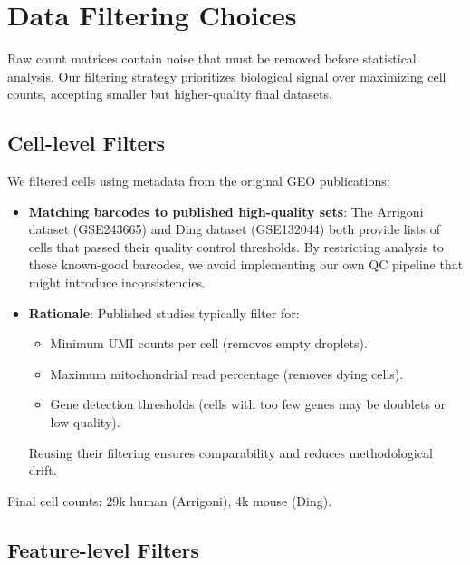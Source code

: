 \section{Data Filtering Choices}

Raw count matrices contain noise that must be removed before statistical analysis. Our filtering strategy prioritizes biological signal over maximizing cell counts, accepting smaller but higher-quality final datasets.

\subsection*{Cell-level Filters}

We filtered cells using metadata from the original GEO publications:

\begin{itemize}
    \item \textbf{Matching barcodes to published high-quality sets}: The Arrigoni dataset (GSE243665) and Ding dataset (GSE132044\cite{ding2020systematic}) both provide lists of cells that passed their quality control thresholds. By restricting analysis to these known-good barcodes, we avoid implementing our own QC pipeline that might introduce inconsistencies.
    \item \textbf{Rationale}: Published studies typically filter for:
    \begin{itemize}
        \item Minimum UMI counts per cell (removes empty droplets).
        \item Maximum mitochondrial read percentage (removes dying cells).
        \item Gene detection thresholds (cells with too few genes may be doublets or low quality).
    \end{itemize}
    Reusing their filtering ensures comparability and reduces methodological drift.
\end{itemize}


Final cell counts: 29k human (Arrigoni), 4k mouse (Ding).

\subsection*{Feature-level Filters}

